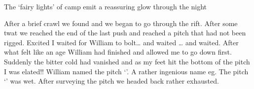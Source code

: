 \begin{marginfigure}
\centering
  \caption{The `fairy lights' of camp \protect{} emit a reassuring glow through the night }
\end{marginfigure}

After a brief crawl we found   and we began to go through the rift. After some twat we reached the end of the last push and reached a pitch that had not been rigged. Excited I waited for William to bolt… and waited … and waited. After what felt like an age William had finished and allowed me to go down first. Suddenly the bitter cold had vanished and as my feet hit the bottom of the pitch I was elated!! William named the pitch `'. A rather ingenious name eg. The pitch `' was wet. After surveying the pitch we headed back rather exhausted. 

